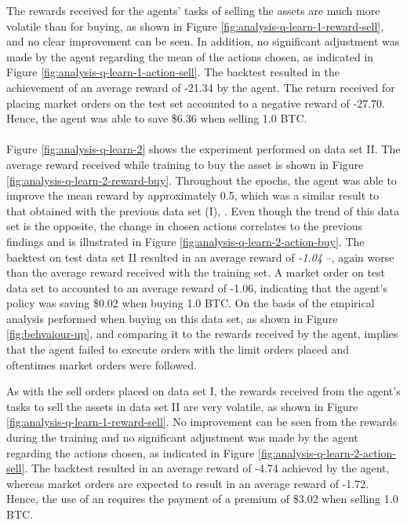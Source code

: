The rewards received for the agents' tasks of selling the assets are much more volatile than for buying, as shown in Figure \ref{fig:analysis-q-learn-1-reward-sell}, and no clear improvement can be seen.
In addition, no significant adjustment was made by the agent regarding the mean of the actions chosen, as indicated in Figure \ref{fig:analysis-q-learn-1-action-sell}.
The backtest resulted in the achievement of an average reward of -21.34 by the agent.
The return received for placing market orders on the test set accounted to a negative reward of -27.70.
Hence, the agent was able to save \$6.36 when selling 1.0 BTC.
\\
\\
Figure \ref{fig:analysis-q-learn-2} shows the experiment performed on data set II.
The average reward received while training to buy the asset is shown in Figure \ref{fig:analysis-q-learn-2-reward-buy}.
Throughout the epochs, the agent was able to improve the mean reward by approximately 0.5, which was a similar result to that obtained with the previous data set (I), .
Even though the trend of this data set is the opposite, the change in chosen actions correlates to the previous findings and is illustrated in Figure \ref{fig:analysis-q-learn-2-action-buy}.
The backtest on test data set II resulted in an average reward of \textit{-1.04} --,  again worse than the average reward received with the training set.
A market order on test data set to accounted to an average reward of -1.06, indicating that the agent's policy was saving \$0.02 when buying 1.0 BTC.
On the basis of the empirical analysis performed when buying on this data set, as shown in Figure \ref{fig:behvaiour-up}, and comparing it to the rewards received by the agent, implies that the agent failed to execute orders with the limit orders placed and oftentimes market orders were followed.

As with the sell orders placed on data set I, the rewards received from the agent's tasks to sell the assets in data set II are very volatile, as shown in Figure \ref{fig:analysis-q-learn-1-reward-sell}.
No improvement can be seen from the rewards during the training and no significant adjustment was made by the agent regarding the actions chosen, as indicated in Figure \ref{fig:analysis-q-learn-2-action-sell}.
The backtest resulted in an average reward of -4.74 achieved by the agent, whereas market orders are expected to result in an average reward of -1.72.
Hence, the use of an requires the payment of a premium of \$3.02 when selling 1.0 BTC.

